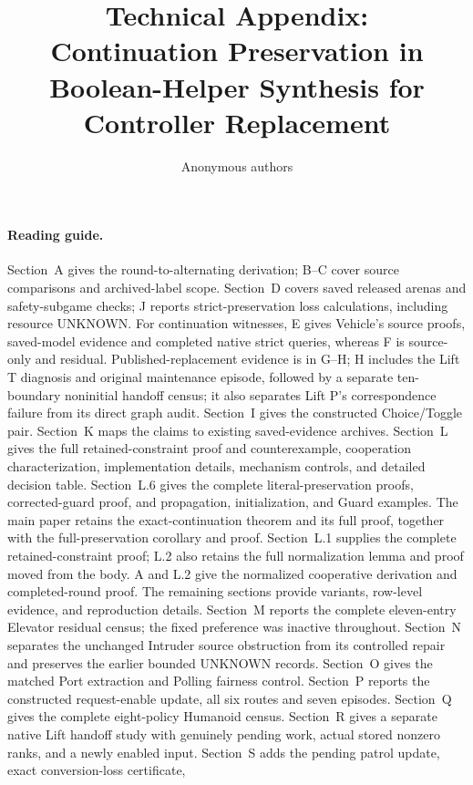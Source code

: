 \documentclass[11pt]{article}
\title{Technical Appendix:\\
Continuation Preservation in Boolean-Helper Synthesis for Controller Replacement}
\author{Anonymous authors}
\date{}
\begin{document}
\maketitle


\paragraph{Reading guide.}
Section~A gives the round-to-alternating derivation; B--C cover source
comparisons and archived-label scope. Section~D covers saved released arenas
and safety-subgame checks; J reports strict-preservation loss calculations,
including resource UNKNOWN. For continuation witnesses, E gives Vehicle's
source proofs, saved-model evidence and completed native strict queries,
whereas F is source-only and residual.
Published-replacement evidence is in G--H; H includes the Lift T diagnosis
and original maintenance episode, followed by a separate ten-boundary
noninitial handoff census; it also separates Lift P's correspondence
failure from its direct graph audit. Section~I gives the
constructed Choice/Toggle pair. Section~K maps the claims to existing saved-evidence archives. Section~L
gives the full retained-constraint proof and counterexample, cooperation
characterization, implementation details, mechanism controls, and detailed
decision table. Section~L.6 gives the complete literal-preservation
proofs, corrected-guard proof, and propagation, initialization, and Guard
examples. The main paper retains the exact-continuation theorem and its full proof,
together with the full-preservation corollary and proof. Section~L.1 supplies
the complete retained-constraint proof; L.2 also retains the full normalization
lemma and proof moved from the body. A and L.2 give the normalized
cooperative derivation and completed-round proof. The remaining sections
provide variants, row-level evidence, and reproduction details.
Section~M reports the complete eleven-entry Elevator residual census;
the fixed preference was inactive throughout.
Section~N separates the unchanged Intruder source obstruction from its
controlled repair and preserves the earlier bounded UNKNOWN records.
Section~O gives the matched Port extraction and Polling fairness control.
Section~P reports the constructed request-enable update, all six routes
and seven episodes. Section~Q gives the complete eight-policy Humanoid
census. Section~R gives a separate native Lift handoff study with
genuinely pending work, actual stored nonzero ranks, and a newly enabled input.
Section~S adds the pending patrol update, exact conversion-loss certificate,
\end{document}
